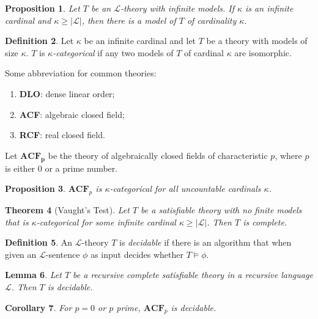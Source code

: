 \documentclass{amsart}
\newtheorem{theorem}{Theorem}[subsection]
\newtheorem{lemma}[theorem]{Lemma}
\newtheorem{proposition}[theorem]{Proposition}
\newtheorem{corollary}[theorem]{Corollary}
\theoremstyle{definition}
\newtheorem{definition}[theorem]{Definition}
\numberwithin{equation}{section}
\begin{document}
\begin{proposition}
    Let $T$ be an $\mathcal{L}$-theory with infinite models.
    If $\kappa$ is an infinite cardinal and $\kappa \ge |\mathcal{L}|$,
    then there is a model of $T$ of cardinality $\kappa$.
\end{proposition}

\begin{definition}
    Let $\kappa$ be an infinite cardinal and let $T$ be a theory with models of size $\kappa$.
    $T$ is \emph{$\kappa$-categorical} if any two models of $T$ of cardinal $\kappa$ are isomorphic.
\end{definition}

Some abbreviation for common theories:
\begin{enumerate}[label = {}]
    \item \textbf{DLO}: dense linear order;
    \item \textbf{ACF}: algebraic closed field;
    \item \textbf{RCF}: real closed field.
\end{enumerate}

Let $\mathbf{ACF_p}$ be the theory of algebraically closed fields of characteristic $p$,
where $p$ is either $0$ or a prime number.

\begin{proposition} 
    $\mathbf{ACF}_p$ is $\kappa$-categorical for all uncountable cardinals $\kappa$.
\end{proposition}

\begin{theorem}[Vaught's Test]
    Let $T$ be a satisfiable theory with no finite models that is 
    $\kappa$-categorical for some infinite cardinal $\kappa \ge |\mathcal{L}|$.
    Then $T$ is complete.
\end{theorem}

\begin{definition}
    An $\mathcal{L}$-theory $T$ is \emph{decidable} if there is an algorithm that when given an $\mathcal{L}$-sentence $\phi$ as input decides whether $T \models \phi$.
\end{definition}

\begin{lemma}
    Let $T$ be a recursive complete satisfiable theory in a recursive language $\mathcal{L}$. 
    Then $T$ is decidable.
\end{lemma}

\begin{corollary}
    For $p = 0$ or $p$ prime, $\mathbf{ACF}_p$ is decidable.
\end{corollary}
\end{document}
